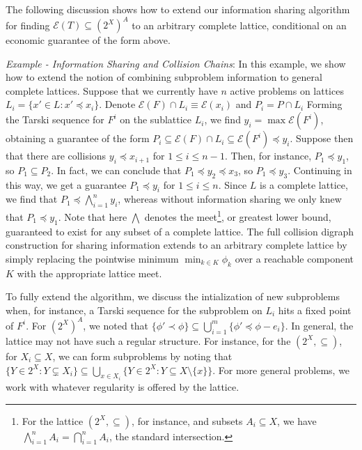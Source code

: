 \documentclass[11pt,reqno]{amsart}
\theoremstyle{definition}
\numberwithin{equation}{section}
\newcommand{\pre}{\phi}
\newcommand{\prealloc}{(2^X)^A}
\newcommand{\sub}{\subseteq}
\newcommand{\fix}{\mathcal{E}}
\newcommand{\peq}{\preceq}
\newcommand{\pe}{\prec}
\newcommand{\oper}{F}
\newcommand{\point}{P}
\newcommand{\lattice}{L}
\begin{document}
The following discussion shows how to extend our information sharing algorithm for finding $\fix(T) \sub \prealloc$ to an arbitrary complete lattice, conditional on an economic guarantee of the form above.

\emph{Example - Information Sharing and Collision Chains}:
In this example, we show how to extend the notion of combining subproblem information to general complete lattices.
Suppose that we currently have $n$ active problems on lattices $L_i = \{x' \in \lattice:x'\peq x_i\}$. 
Denote $\fix(\oper) \cap \lattice_i \equiv \fix(x_i)$ and $\point_i = \point \cap L_i$
Forming the Tarski sequence for $\oper^i$ on the sublattice $\lattice_i$, we find $y_i = \max \fix(\oper^i)$, obtaining a guarantee of the form $\point_i \sub \fix(\oper) \cap \lattice_i \sub \fix(\oper^i) \peq y_i$.
Suppose then that there are collisions $y_i \peq x_{i + 1}$ for $1 \leq i \leq n-1$.
Then, for instance, $\point_1 \peq y_1$, so $\point_1 \sub P_2$. 
In fact, we can conclude that $\point_1 \peq y_2 \peq x_3$, so $\point_1 \peq y_3$.
Continuing in this way, we get a guarantee $\point_1 \peq y_i$ for $1 \leq i \leq n$.
Since $\lattice$ is a complete lattice, we find that $P_1 \peq \bigwedge_{i = 1}^n y_i$, whereas without information sharing we only knew that $P_1 \peq y_1$.
Note that here $\bigwedge$ denotes the meet\footnote{For the lattice $(2^X, \sub)$, for instance, and subsets $A_i \sub X$, we have $\bigwedge_{i = 1}^n A_i = \bigcap_{i =1}^n A_i$, the standard intersection.}, or greatest lower bound, guaranteed to exist for any subset of a complete lattice.
The full collision digraph construction for sharing information extends to an arbitrary complete lattice by simply replacing the pointwise minimum $\min_{k \in K} \pre_k$ over a reachable component $K$ with the appropriate lattice meet.

To fully extend the algorithm, we discuss the intialization of new subproblems when, for instance, a Tarski sequence for the subproblem on $\lattice_i$ hits a fixed point of $\oper^i$.
For $\prealloc$, we noted that $\{\pre' \pe \pre\} \sub \bigcup_{i=1}^m \{\pre' \peq \pre - e_i\}$.
In general, the lattice may not have such a regular structure.
For instance, for the $(2^X, \sub)$, for $X_i \sub X$, we can form subproblems by noting that $\{Y \in 2^X: Y \subsetneq X_i\} \sub \bigcup_{x \in X_i} \{Y \in 2^X: Y \sub X \setminus \{x\} \}$.
For more general problems, we work with whatever regularity is offered by the lattice.
\end{document}
